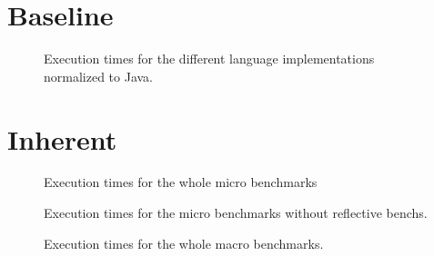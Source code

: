 \documentclass[12pt]{article}
\begin{document}
\section{Baseline}

\begin{figure}[ht]
\begin{center}
\LanguagesPerfComparisonPlot
\end{center}
\vspace*{-5pt}
\caption{Execution times for the different language implementations normalized to Java.}
\label{fig:perf-overview}
\end{figure}

\LanguagesTableSummary

\LanguagesTableOverall


\section{Inherent}

\begin{figure}[ht]
\begin{center}
\MicroPerfComparisonPlot
\end{center}
\vspace*{-5pt}
\caption{Execution times for the whole micro benchmarks}
\label{fig:perf-overview}
\end{figure}

\MicroTableSummary

\MicroTableOverall


\begin{figure}[ht]
\begin{center}
\MicroWithoutRecursivePerfComparisonPlot
\end{center}
\vspace*{-5pt}
\caption{Execution times for the micro benchmarks without reflective benchs.}
\label{fig:perf-overview}
\end{figure}

\MicroWithoutRecursiveTableSummary

\MicroWithoutRecursiveTableOverall


\begin{figure}[ht]
\begin{center}
\MacroPerfComparisonPlot
\end{center}
\vspace*{-5pt}
\caption{Execution times for the whole macro benchmarks.}
\label{fig:perf-overview}
\end{figure}
\end{document}
